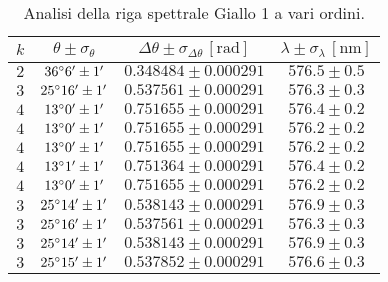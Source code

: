 \documentclass[]{article}
\begin{document}
    \begin{table}
        \centering
        \begin{tabular}{||c|c|c|c||}
            \hline
            $k$ & $\theta \pm \sigma_{\theta}$ & $\Delta\theta \pm \sigma_{\Delta\theta} \, \left[\text{rad}\right]$ & $\lambda \pm \sigma_{\lambda} \, \left[\text{nm}\right]$ \\\hline
            \hline
            $2$ & $36\degree  6' \pm 1'$ & $0.348484 \pm 0.000291$ & $576.5 \pm 0.5$ \\\hline
            $3$ & $25\degree 16' \pm 1'$ & $0.537561 \pm 0.000291$ & $576.3 \pm 0.3$ \\\hline
            $4$ & $13\degree  0' \pm 1'$ & $0.751655 \pm 0.000291$ & $576.4 \pm 0.2$ \\\hline
            $4$ & $13\degree  0' \pm 1'$ & $0.751655 \pm 0.000291$ & $576.2 \pm 0.2$ \\\hline
            $4$ & $13\degree  0' \pm 1'$ & $0.751655 \pm 0.000291$ & $576.2 \pm 0.2$ \\\hline
            $4$ & $13\degree  1' \pm 1'$ & $0.751364 \pm 0.000291$ & $576.4 \pm 0.2$ \\\hline
            $4$ & $13\degree  0' \pm 1'$ & $0.751655 \pm 0.000291$ & $576.2 \pm 0.2$ \\\hline
            $3$ & $25\degree 14' \pm 1'$ & $0.538143 \pm 0.000291$ & $576.9 \pm 0.3$ \\\hline
            $3$ & $25\degree 16' \pm 1'$ & $0.537561 \pm 0.000291$ & $576.3 \pm 0.3$ \\\hline
            $3$ & $25\degree 14' \pm 1'$ & $0.538143 \pm 0.000291$ & $576.9 \pm 0.3$ \\\hline
            $3$ & $25\degree 15' \pm 1'$ & $0.537852 \pm 0.000291$ & $576.6 \pm 0.3$ \\\hline
        \end{tabular}
        \label{giallo-1}
        \caption{Analisi della riga spettrale Giallo 1 a vari ordini.}
    \end{table}
\end{document}
